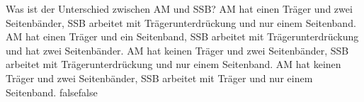     {Was ist der Unterschied zwischen AM und SSB?}
    {AM hat einen Träger und zwei Seitenbänder, SSB arbeitet mit Trägerunterdrückung und nur einem Seitenband.}
    {AM hat einen Träger und ein Seitenband, SSB arbeitet mit Trägerunterdrückung und hat zwei Seitenbänder.}
    {AM hat keinen Träger und zwei Seitenbänder, SSB arbeitet mit Trägerunterdrückung und nur einem Seitenband.}
    {AM hat keinen Träger und zwei Seitenbänder, SSB arbeitet mit Träger und nur einem Seitenband.}
    {false}{false}